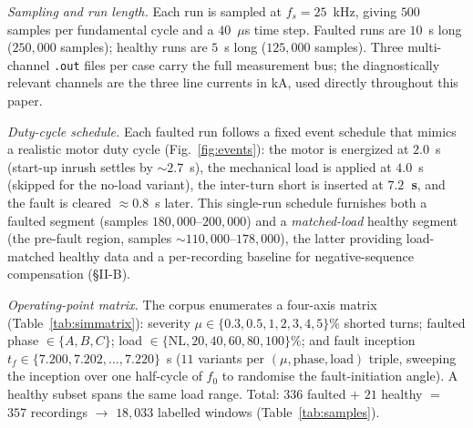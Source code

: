 \documentclass[journal]{IEEEtran}
\begin{document}
\emph{Sampling and run length.} Each run is sampled at $f_s = 25$~kHz, giving $500$ samples
per fundamental cycle and a $40$~$\mu$s time step. Faulted runs are $10$~s long
($250{,}000$ samples); healthy runs are $5$~s long ($125{,}000$ samples). Three multi-channel
\texttt{.out} files per case carry the full measurement bus; the diagnostically relevant
channels are the three line currents in kA, used directly throughout this paper.

\emph{Duty-cycle schedule.} Each faulted run follows a fixed event schedule that mimics a
realistic motor duty cycle (Fig.~\ref{fig:events}): the motor is energized at $2.0$~s
(start-up inrush settles by $\sim 2.7$~s), the mechanical load is applied at $4.0$~s
(skipped for the no-load variant), the inter-turn short is inserted at \textbf{$7.2$~s}, and
the fault is cleared $\approx 0.8$~s later. This single-run schedule furnishes both a
faulted segment (samples $180{,}000$--$200{,}000$) and a \emph{matched-load} healthy segment
(the pre-fault region, samples $\sim\!110{,}000$--$178{,}000$), the latter providing
load-matched healthy data and a per-recording baseline for negative-sequence compensation
(\S II-B).

\emph{Operating-point matrix.} The corpus enumerates a four-axis matrix
(Table~\ref{tab:simmatrix}): severity $\mu \in \{0.3, 0.5, 1, 2, 3, 4, 5\}\%$ shorted
turns; faulted phase $\in \{A, B, C\}$; load $\in \{\mathrm{NL}, 20, 40, 60, 80, 100\}\%$;
and fault inception $t_f \in \{7.200, 7.202, \dots, 7.220\}$~s ($11$ variants per
$(\mu, \mathrm{phase}, \mathrm{load})$ triple, sweeping the inception over one half-cycle
of $f_0$ to randomise the fault-initiation angle). A healthy subset spans the same load
range. Total: $336$ faulted $+$ $21$ healthy $=$ $357$ recordings $\rightarrow$ $18{,}033$
labelled windows (Table~\ref{tab:samples}).
\end{document}
